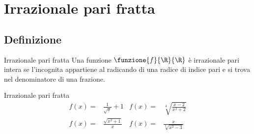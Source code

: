 \section{Irrazionale pari fratta}
\subsection{Definizione}
\begin{definizionet}{Irrazionale pari fratta}{}
	Una funzione $\funzione{f}{\R}{\R}$ è irrazionale pari intera se l'incognita appartiene al radicando di una radice di indice pari e   si trova nel denominatore di una frazione. 
\end{definizionet}
\begin{esempiot}{Irrazionale pari fratta}{}
	\begin{align*}
	f(x)=&\frac{1}{\sqrt{x}}+1&f(x)=&\sqrt[4]{\frac{x-2}{x^2+2}}\\
	f(x)=&\frac{\sqrt{x^2+1}}{x}&f(x)=&\frac{x}{\sqrt[6]{x^2-3}}\\
	\end{align*}
\end{esempiot}
